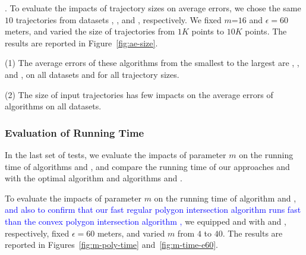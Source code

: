 {%
.
To evaluate the impacts of trajectory sizes on average errors, we chose the same
{$10$} trajectories from  datasets \sercar, \geolife, \mopsi and \pricar, respectively.
We fixed {$m$=$16$} and $\epsilon = 60$ meters, and varied the size  of trajectories from $1K$ points to $10K$ points.
%
The results are reported in Figure~\ref{fig:ae-size}.

\ni(1) The average errors of these algorithms from the smallest to the largest are \squishe, \dps, \cist and \cista, on all datasets and for all trajectory sizes. %

\ni(2) The size of input trajectories has few impacts on the average errors of \lsa algorithms on all datasets.



	





\subsubsection{Evaluation of Running Time}

In the last set of tests, we evaluate the impacts of parameter $m$ on the running time of algorithms \cist and \cista, and compare the running time of our approaches \cist and \cista with the optimal algorithm and algorithms \dps and \squishe.

%

To evaluate the impacts of parameter $m$ on the running time of algorithm \cist and \cista, 
\textcolor{blue}{and also to confirm that our fast regular polygon intersection algorithm \rpia runs fast than the convex polygon intersection algorithm \cpia, }
we equipped \cist and \cista with \rpia and \cpia, respectively, fixed $\epsilon =60$ meters, and varied $m$ from $4$ to $40$.
%
The results are reported in Figures~\ref{fig:m-poly-time} and~\ref{fig:m-time-e60}.

}
